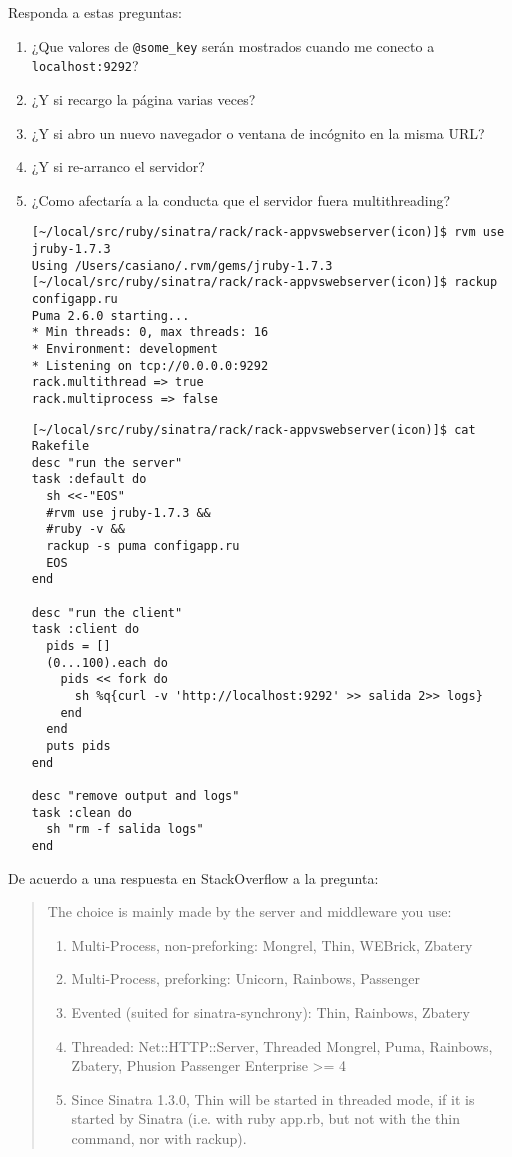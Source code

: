 Responda a estas preguntas:
\begin{enumerate}
\item 
¿Que valores de \verb|@some_key| serán mostrados cuando me conecto a \verb|localhost:9292|?
\item 
¿Y si recargo la página varias veces?
\item 
¿Y si abro un nuevo navegador o ventana de incógnito en la misma URL?
\item 
¿Y si re-arranco el servidor?
\item 
¿Como afectaría a la conducta que el servidor fuera multithreading?
\begin{verbatim}
[~/local/src/ruby/sinatra/rack/rack-appvswebserver(icon)]$ rvm use jruby-1.7.3
Using /Users/casiano/.rvm/gems/jruby-1.7.3
[~/local/src/ruby/sinatra/rack/rack-appvswebserver(icon)]$ rackup configapp.ru 
Puma 2.6.0 starting...
* Min threads: 0, max threads: 16
* Environment: development
* Listening on tcp://0.0.0.0:9292
rack.multithread => true
rack.multiprocess => false
\end{verbatim}
\begin{verbatim}
[~/local/src/ruby/sinatra/rack/rack-appvswebserver(icon)]$ cat Rakefile 
desc "run the server"
task :default do
  sh <<-"EOS"
  #rvm use jruby-1.7.3 &&
  #ruby -v &&
  rackup -s puma configapp.ru 
  EOS
end

desc "run the client"
task :client do
  pids = []
  (0...100).each do
    pids << fork do
      sh %q{curl -v 'http://localhost:9292' >> salida 2>> logs}
    end
  end
  puts pids
end

desc "remove output and logs"
task :clean do
  sh "rm -f salida logs"
end
\end{verbatim}
\end{enumerate}

De acuerdo a  una respuesta en StackOverflow a la pregunta:
\begin{quote}
The choice is mainly made by the server and middleware you use:

\begin{enumerate}
\item 
Multi-Process, non-preforking: Mongrel, Thin, WEBrick, Zbatery
\item 
Multi-Process, preforking: Unicorn, Rainbows, Passenger
\item 
Evented (suited for sinatra-synchrony): Thin, Rainbows, Zbatery
\item 
Threaded: Net::HTTP::Server, Threaded Mongrel, Puma, Rainbows,
Zbatery, Phusion Passenger Enterprise >= 4
\item 
Since Sinatra 1.3.0, Thin will be started in threaded mode, if
it is started by Sinatra (i.e. with ruby app.rb, but not with the
thin command, nor with rackup).
\end{enumerate}
\end{quote}

